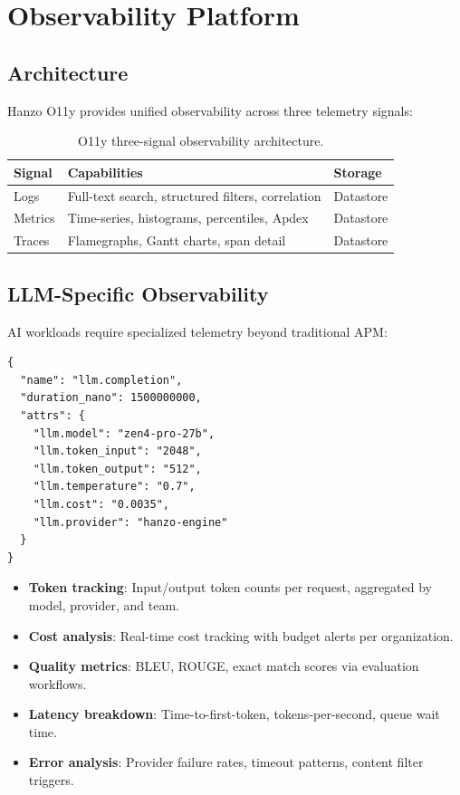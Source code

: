 \documentclass[11pt,letterpaper]{article}
\begin{document}
\section{Observability Platform}

\subsection{Architecture}

Hanzo O11y provides unified observability across three telemetry signals:

\begin{table}[H]
\centering
\begin{tabular}{@{}lp{5cm}l@{}}
\toprule
\textbf{Signal} & \textbf{Capabilities} & \textbf{Storage} \\
\midrule
Logs & Full-text search, structured filters, correlation & Datastore \\
Metrics & Time-series, histograms, percentiles, Apdex & Datastore \\
Traces & Flamegraphs, Gantt charts, span detail & Datastore \\
\bottomrule
\end{tabular}
\caption{O11y three-signal observability architecture.}
\label{tab:o11y-signals}
\end{table}

\subsection{LLM-Specific Observability}

AI workloads require specialized telemetry beyond traditional APM:

\begin{lstlisting}[caption={LLM span attributes in O11y trace.}]
{
  "name": "llm.completion",
  "duration_nano": 1500000000,
  "attrs": {
    "llm.model": "zen4-pro-27b",
    "llm.token_input": "2048",
    "llm.token_output": "512",
    "llm.temperature": "0.7",
    "llm.cost": "0.0035",
    "llm.provider": "hanzo-engine"
  }
}
\end{lstlisting}

\begin{itemize}
\item \textbf{Token tracking}: Input/output token counts per request, aggregated by model, provider, and team.
\item \textbf{Cost analysis}: Real-time cost tracking with budget alerts per organization.
\item \textbf{Quality metrics}: BLEU, ROUGE, exact match scores via evaluation workflows.
\item \textbf{Latency breakdown}: Time-to-first-token, tokens-per-second, queue wait time.
\item \textbf{Error analysis}: Provider failure rates, timeout patterns, content filter triggers.
\end{itemize}
\end{document}
